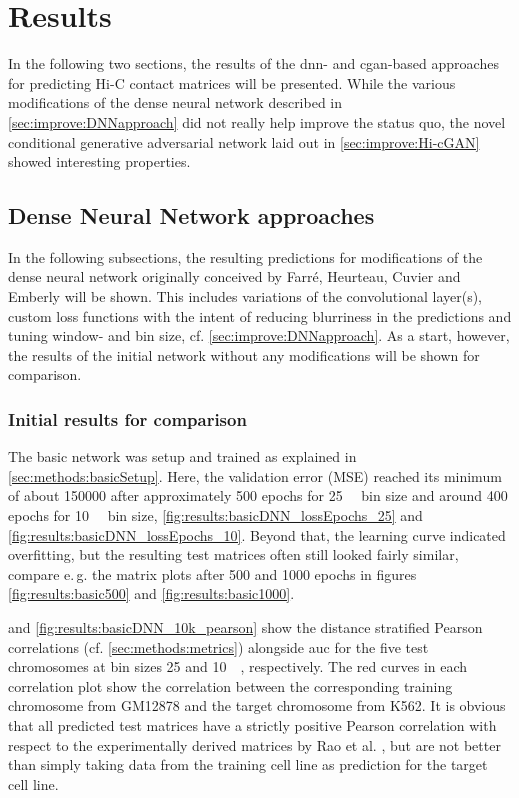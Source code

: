 \section{Results}
In the following two sections, 
the results of the \acrshort{dnn}- and \acrshort{cgan}-based approaches for predicting Hi-C contact matrices will be presented.
While the various modifications of the dense neural network described in \cref{sec:improve:DNNapproach} 
did  not really help improve the status quo, the novel conditional generative adversarial network laid out in \cref{sec:improve:Hi-cGAN}
showed interesting properties.

\subsection{Dense Neural Network approaches} \label{sec:results:DNN}
In the following subsections, the resulting predictions for modifications of the dense neural network originally conceived 
by Farr\'e, Heurteau, Cuvier and Emberly \cite{Farre2018a} will be shown. 
This includes variations of the convolutional layer(s), custom loss functions with the intent of reducing blurriness in the predictions
and tuning window- and bin size, cf. \cref{sec:improve:DNNapproach}.
As a start, however, the results of the initial network without any modifications will be shown for comparison.

\subsubsection{Initial results for comparison} \label{sec:initialDNNresults}
The basic network was setup and trained as explained in \cref{sec:methods:basicSetup}.
Here, the validation error (MSE) reached its minimum of about \SI{150000}{} 
after approximately 500 epochs for \SI{25}{\kilo\bp} bin size and around 400 epochs for \SI{10}{\kilo\bp} bin size, \cref{fig:results:basicDNN_lossEpochs_25} and \ref{fig:results:basicDNN_lossEpochs_10}.
Beyond that, the learning curve indicated overfitting, but the resulting test matrices often still looked fairly similar, 
compare e.\,g. the matrix plots after 500 and 1000 epochs in figures \ref{fig:results:basic500} and \ref{fig:results:basic1000}.

 and \cref{fig:results:basicDNN_10k_pearson} 
show the distance stratified Pearson correlations (cf. \cref{sec:methods:metrics}) 
alongside \acrfull{auc} for the five test chromosomes at bin sizes 25 and \SI{10}{\kilo\bp}, respectively.
The red curves in each correlation plot show the correlation between the corresponding training chromosome from GM12878 and the target chromosome from K562.
It is obvious that all predicted test matrices have a strictly positive Pearson correlation with respect to the experimentally derived matrices by Rao et al. \cite{Rao2014},
but are not better than simply taking data from the training cell line as prediction for the target cell line.

